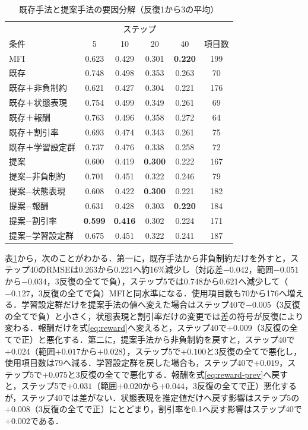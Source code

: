 \documentclass[paper]{ieicej}
\begin{document}
\begin{table}[t]
\centering
\caption{既存手法と提案手法の要因分解（反復1から3の平均）}
\label{tab:ablation}
\footnotesize
\setlength{\tabcolsep}{3pt}
\begin{tabular}{lccccc}
\hline
 & \multicolumn{4}{c}{ステップ} & \\
条件 & 5 & 10 & 20 & 40 & 項目数\\
\hline
MFI & 0.623 & 0.429 & 0.301 & \textbf{0.220} & 199\\
\hline
既存 & 0.748 & 0.498 & 0.353 & 0.263 & 70\\
既存＋非負制約 & 0.621 & 0.427 & 0.304 & 0.221 & 176\\
既存＋状態表現 & 0.754 & 0.499 & 0.349 & 0.261 & 69\\
既存＋報酬 & 0.763 & 0.496 & 0.358 & 0.272 & 64\\
既存＋割引率 & 0.693 & 0.474 & 0.343 & 0.261 & 75\\
既存＋学習設定群 & 0.737 & 0.476 & 0.338 & 0.258 & 72\\
\hline
提案 & 0.600 & 0.419 & \textbf{0.300} & 0.222 & 167\\
提案−非負制約 & 0.701 & 0.451 & 0.322 & 0.246 & 79\\
提案−状態表現 & 0.608 & 0.422 & \textbf{0.300} & 0.221 & 182\\
提案−報酬 & 0.631 & 0.428 & 0.303 & \textbf{0.220} & 184\\
提案−割引率 & \textbf{0.599} & \textbf{0.416} & 0.302 & 0.224 & 171\\
提案−学習設定群 & 0.675 & 0.451 & 0.322 & 0.241 & 187\\
\hline
\end{tabular}
\end{table}

表\ref{tab:ablation}から，次のことがわかる．第一に，既存手法から非負制約だけを外すと，ステップ40のRMSEは0.263から0.221へ約16\%減少し（対応差$-0.042$，範囲$-0.051$から$-0.034$，3反復の全てで負），ステップ5では0.748から0.621へ減少して（$-0.127$，3反復の全てで負）MFIと同水準になる．使用項目数も70から176へ増える．学習設定群だけを提案手法の値へ変えた場合はステップ40で$-0.005$（3反復の全てで負）と小さく，状態表現と割引率だけの変更では差の符号が反復により変わる．報酬だけを式\eqref{eq:reward}へ変えると，ステップ40で$+0.009$（3反復の全てで正）と悪化する．第二に，提案手法から非負制約を戻すと，ステップ40で$+0.024$（範囲$+0.017$から$+0.028$），ステップ5で$+0.100$と3反復の全てで悪化し，使用項目数は79へ減る．学習設定群を戻した場合も，ステップ40で$+0.019$，ステップ5で$+0.075$と3反復の全てで悪化する．報酬を式\eqref{eq:reward-prev}へ戻すと，ステップ5で$+0.031$（範囲$+0.020$から$+0.044$，3反復の全てで正）悪化するが，ステップ40では差がない．状態表現を推定値だけへ戻す影響はステップ5の$+0.008$（3反復の全てで正）にとどまり，割引率を0.1へ戻す影響はステップ40で$+0.002$である．
\end{document}
